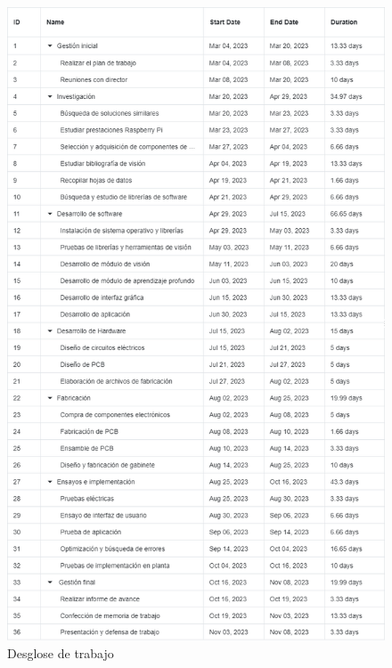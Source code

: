 \documentclass[
11pt, %
codirector, %
]{charter}
\begin{document}
\begin{figure}[htpb]
\centering 
\includegraphics[height=.9\textheight]{./Figuras/wbs.png}
\caption{Desglose de trabajo}
\label{fig:WBSGantt}
\end{figure}
\end{document}

